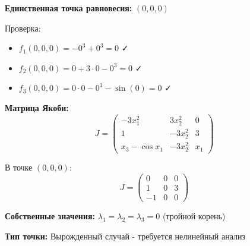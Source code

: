 \textbf{Единственная точка равновесия:} $(0, 0, 0)$

Проверка:
\begin{itemize}
\item $f_1(0,0,0) = -0^3 + 0^3 = 0$ ✓
\item $f_2(0,0,0) = 0 + 3 \cdot 0 - 0^3 = 0$ ✓
\item $f_3(0,0,0) = 0 \cdot 0 - 0^3 - \sin(0) = 0$ ✓
\end{itemize}

\textbf{Матрица Якоби:}
$$J = \begin{pmatrix} 
-3x_1^2 & 3x_2^2 & 0 \\
1 & -3x_2^2 & 3 \\
x_3 - \cos x_1 & -3x_2^2 & x_1
\end{pmatrix}$$

В точке $(0, 0, 0)$:
$$J = \begin{pmatrix} 
0 & 0 & 0 \\
1 & 0 & 3 \\
-1 & 0 & 0
\end{pmatrix}$$

\textbf{Собственные значения:} $\lambda_1 = \lambda_2 = \lambda_3 = 0$ (тройной корень)

\textbf{Тип точки:} Вырожденный случай - требуется нелинейный анализ
